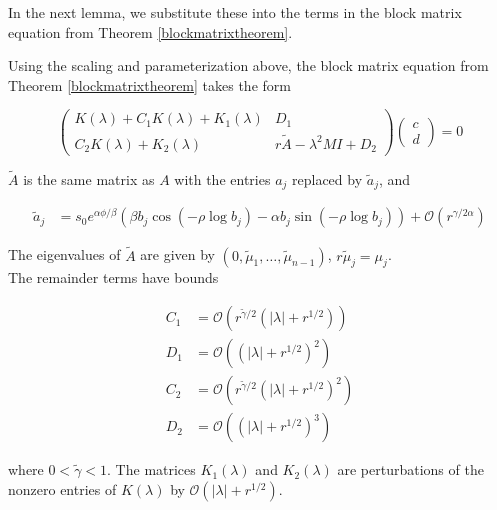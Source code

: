 \documentclass[thesis.tex]{subfiles}
\begin{document}
In the next lemma, we substitute these into the terms in the block matrix equation from Theorem \ref{blockmatrixtheorem}.


\begin{lemma}\label{reparam}
Using the scaling and parameterization above, the block matrix equation from Theorem \ref{blockmatrixtheorem} takes the form

\begin{equation}\label{blockeq}
\begin{pmatrix}
K(\lambda) + C_1 K(\lambda) + K_1(\lambda) & D_1 \\
C_2 K(\lambda) + K_2(\lambda) & r \tilde{A} - \lambda^2 MI + D_2
\end{pmatrix}
\begin{pmatrix}c \\ d \end{pmatrix} 
= 0
\end{equation}

$\tilde{A}$ is the same matrix as $A$ with the entries $a_j$ replaced by $\tilde{a}_j$, and 

\begin{align}\label{tildea}
\tilde{a}_j 
&= s_0 e^{\alpha \phi/\beta} \left( \beta b_j \cos\left( -\rho \log b_j \right) - \alpha b_j \sin \left( -\rho \log b_j  \right) \right) + \mathcal{O}(r^{\gamma/2\alpha})
\end{align}

The eigenvalues of $\tilde{A}$ are given by $(0, \tilde{\mu}_1, \dots, \tilde{\mu}_{n-1})$, $r \tilde{\mu}_j = \mu_j$.\\

The remainder terms have bounds

\begin{align*}
C_1 &= \mathcal{O}\left(r^{\tilde{\gamma}/2}(|\lambda| + r^{1/2})\right) \\
D_1 &= \mathcal{O}\left((|\lambda| + r^{1/2})^2\right) \\
C_2 &= \mathcal{O}\left(r^{\tilde{\gamma}/2}(|\lambda| + r^{1/2})^2\right) \\
D_2 &= \mathcal{O}\left((|\lambda| + r^{1/2})^3\right)
\end{align*}

where $0 < \tilde{\gamma} < 1$. The matrices $K_1(\lambda)$ and $K_2(\lambda)$ are perturbations of the nonzero entries of $K(\lambda)$ by $\mathcal{O}(|\lambda| + r^{1/2})$.\\


\end{lemma}
\end{document}
